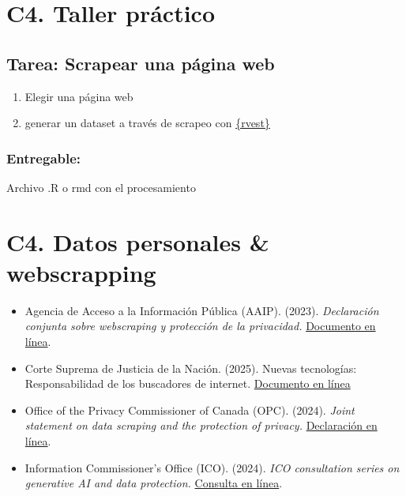 \documentclass[
  letterpaper,
  DIV=11,
  numbers=noendperiod]{scrreprt}
\providecommand{\tightlist}{%
  \setlength{\itemsep}{0pt}\setlength{\parskip}{0pt}}\usepackage{longtable,booktabs,array}
\begin{document}
\chapter{C4. Taller práctico}\label{c4.-taller-pruxe1ctico}

\section{Tarea: Scrapear una página
web}\label{tarea-scrapear-una-puxe1gina-web}

\begin{enumerate}
\def\labelenumi{\arabic{enumi})}
\tightlist
\item
  Elegir una página web
\item
  generar un dataset a través de scrapeo con
  \href{https://rvest.tidyverse.org/}{\{rvest\}}
\end{enumerate}

\subsection{Entregable:}\label{entregable}

Archivo .R o rmd con el procesamiento

\chapter{C4. Datos personales \&
webscrapping}\label{c4.-datos-personales-webscrapping}

\begin{itemize}
\item
  Agencia de Acceso a la Información Pública (AAIP). (2023).
  \emph{Declaración conjunta sobre webscraping y protección de la
  privacidad.}
  \href{https://www.argentina.gob.ar/sites/default/files/declaracion_conjunta_aaip_datascraping.pdf}{Documento
  en línea}.
\item
  Corte Suprema de Justicia de la Nación. (2025). Nuevas tecnologías:
  Responsabilidad de los buscadores de internet.
  \href{https://sj.csjn.gov.ar/homeSJ/notas/nota/189/documento}{Documento
  en línea}
\item
  Office of the Privacy Commissioner of Canada (OPC). (2024).
  \emph{Joint statement on data scraping and the protection of privacy.}
  \href{https://www.priv.gc.ca/en/opc-news/speeches-and-statements/2024/js-dc_20241028/}{Declaración
  en línea}.
\item
  Information Commissioner's Office (ICO). (2024). \emph{ICO
  consultation series on generative AI and data protection.}
  \href{https://ico.org.uk/about-the-ico/ico-and-stakeholder-consultations/ico-consultation-series-on-generative-ai-and-data-protection/}{Consulta
  en línea}.
\end{itemize}
\end{document}
